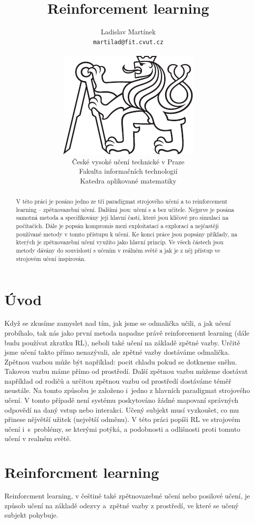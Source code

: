 \documentclass{article}
\title{Reinforcement learning}
\author{
  Ladislav Martínek\\
  \texttt{martilad@fit.cvut.cz} \\
  \\
  \includegraphics[width=.16\textwidth]{./img/cvut-logo-bw}
  \\
  České vysoké učení technické v Praze\\
  Fakulta informačních technologií\\
  Katedra aplikované matematiky\\  
}
\begin{document}
\maketitle

\begin{abstract}
V této práci je posáno jedno ze tří paradigmat strojového učení a to reinforcement learning -- zpětnovazební učení. Dalšími jsou: učení s a bez učitele. Nejprve je posána samotná metoda a specifikovány její hlavní časti, které jsou klíčové pro simulaci na počítačích. Dále je popsán kompromis mezi exploitatací a explorací a nejčastěji používané metody v tomto přístupu k učení. Ke konci práce jsou popsány příklady, na kterých je zpětnovazební učení využito jako hlavní princip. Ve všech částech jsou metody dávány do souvislostí s učením v reálném světě a jak je z něj přístup ve strojovém učení inspirován.
\end{abstract}




\section{Úvod}
Když se zkusíme zamyslet nad tím, jak jsme se odmalička učili, a jak učení probíhalo, tak nás jako první metoda napadne právě reinforcement learning (dále budu používat zkratku RL), neboli také učení na základě zpětné vazby. Určitě jsme učení takto přímo nenazývali, ale zpětné vazby dostáváme odmalička. Zpětnou vazbou může být například: pocit chladu pokud se dotkneme sněhu. Takovou vazbu máme přímo od prostředí. Další zpětnou vazbu můžeme dostávat například od rodičů a určitou zpětnou vazbu od prostředí dostáváme téměř neustále. Na tomto způsobu je založeno i~jedno z hlavních paradigmat strojového učení. V tomto případě není systému poskytováno žádné mapovaní správných odpovědí na daný vstup nebo interakci. Učený subjekt musí vyzkoušet, co mu přinese nějvětší užitek (největší odměnu). V této práci popíši RL ve strojovém učení i~s~problémy, se kterými potýká, a podobnosti a odlišnosti proti tomuto učení v realném světě. 


\section{Reinforcment learning}
\label{sec:headings}

Reinforcment learning, v češtině také zpětnovazebné učení nebo posilové učení, je způsob učení na základě odezvy a~zpětné vazby z prostředí, ve které se učený subjekt pohybuje. 
\end{document}
